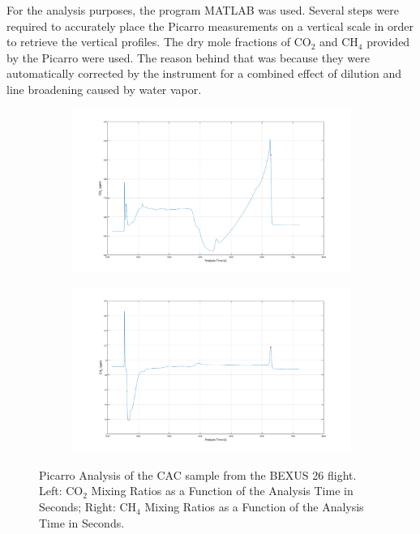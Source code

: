 For the analysis purposes, the program MATLAB was used. Several steps were required to accurately place the Picarro measurements on a vertical scale in order to retrieve the vertical profiles. The dry mole fractions of CO$_2$ and CH$_4$ provided by the Picarro were used. The reason behind that was because they were automatically corrected by the instrument for a combined effect of dilution and line broadening caused by water vapor.

\begin{figure}[H]
    \centering
    \begin{subfigure}[b]{0.4\textwidth}
            \centering
            \includegraphics[width=\textwidth]{7-data-analysis-and-results/img/FinalCO2.png}
    \label{fig:CO2mixing}
    \end{subfigure}
\begin{subfigure}[b]{0.4\textwidth}
            \centering
            \includegraphics[width=\textwidth]{7-data-analysis-and-results/img/FinalCH4.png}
    \label{fig:CH4mixing}
    \end{subfigure}
    \caption{Picarro Analysis of the CAC sample from the BEXUS 26 flight. Left: CO$_2$ Mixing Ratios as a Function of the Analysis Time in Seconds; Right: CH$_4$ Mixing Ratios as a Function of the Analysis Time in Seconds. \label{fig:mixingratios}}
\end{figure}

